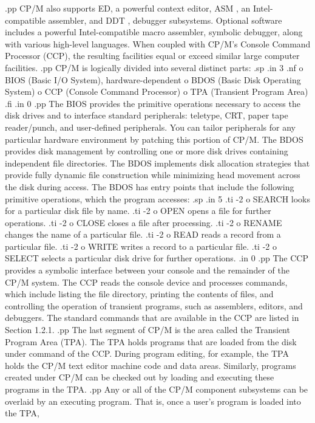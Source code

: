 .pp
CP/M also supports ED, a powerful context editor, ASM , an Intel-compatible 
assembler, and DDT , debugger subsystems.  Optional software includes a 
powerful 
Intel-compatible macro assembler, symbolic debugger, along with various 
high-level languages.  When coupled with CP/M's Console Command 
Processor (CCP), 
the resulting facilities equal or exceed similar large computer facilities.
.pp
CP/M is logically divided into several distinct parts:
.sp
.in 3
.nf
o BIOS (Basic I/O System), hardware-dependent
o BDOS (Basic Disk Operating System)
o CCP (Console Command Processor)
o TPA (Transient Program Area)
.fi
.in 0
.pp
The BIOS provides the primitive operations necessary to access the disk 
drives and to interface standard peripherals:  teletype, CRT, paper tape 
reader/punch, and user-defined peripherals.  You can tailor 
peripherals for any particular hardware environment by patching this 
portion of 
CP/M.  The BDOS provides disk management by controlling one or more disk 
drives containing independent file directories.  The BDOS implements disk 
allocation strategies that provide fully dynamic file construction while 
minimizing head movement across the disk during access.  The BDOS has entry 
points that include the following primitive operations, which the 
program accesses:
.sp 
.in 5
.ti -2
o SEARCH looks for a particular disk file by name.
.ti -2
o OPEN opens a file for further operations.
.ti -2
o CLOSE closes a file after processing.
.ti -2
o RENAME changes the name of a particular file.
.ti -2
o READ reads a record from a particular file.
.ti -2
o WRITE writes a record to a particular file.
.ti -2
o SELECT selects a particular disk drive for further operations.
.in 0
.pp
The CCP provides a symbolic interface between your console and the 
remainder of the CP/M system.  The CCP reads the console device and 
processes commands, which include listing the file directory, printing the 
contents of files, and controlling the operation of transient programs, such 
as assemblers, editors, and debuggers.  The standard commands that are 
available in the CCP are listed in Section 1.2.1.
.pp
The last segment of CP/M is the area called the Transient Program 
Area (TPA).  The TPA holds programs that are loaded from the disk under 
command of the CCP.  During program editing, for example, the TPA holds 
the CP/M text editor machine code and data areas.  Similarly, programs 
created under CP/M can be checked out by loading and executing these 
programs in the TPA.
.pp
Any or all of the CP/M component subsystems can be overlaid by an 
executing program.  That is, once a user's program is loaded into the TPA, 
